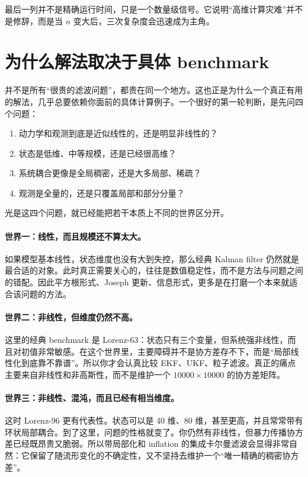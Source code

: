 \documentclass[12pt,a4paper]{ctexart}
\begin{document}
最后一列并不是精确运行时间，只是一个数量级信号。它说明“高维计算灾难”并不是修辞，而是当 \(n\) 变大后，三次复杂度会迅速成为主角。

\section{为什么解法取决于具体 benchmark}

并不是所有“很贵的滤波问题”，都贵在同一个地方。这也正是为什么一个真正有用的解法，几乎总要依赖你面前的具体计算例子。一个很好的第一轮判断，是先问四个问题：
\begin{enumerate}
  \item 动力学和观测到底是近似线性的，还是明显非线性的？
  \item 状态是低维、中等规模，还是已经很高维？
  \item 系统耦合更像是全局稠密，还是大多局部、稀疏？
  \item 观测是全量的，还是只覆盖局部和部分分量？
\end{enumerate}

光是这四个问题，就已经能把若干本质上不同的世界区分开。

\paragraph{世界一：线性，而且规模还不算太大。}
如果模型基本线性，状态维度也没有大到失控，那么经典 Kalman filter 仍然就是最合适的对象。此时真正需要关心的，往往是数值稳定性，而不是方法与问题之间的错配。因此平方根形式、Joseph 更新、信息形式，更多是在打磨一个本来就适合该问题的方法。

\paragraph{世界二：非线性，但维度仍然不高。}
这里的经典 benchmark 是 Lorenz-63：状态只有三个变量，但系统强非线性，而且对初值非常敏感。在这个世界里，主要障碍并不是协方差存不下，而是“局部线性化到底靠不靠谱”。所以你才会认真比较 EKF、UKF、粒子滤波。真正的痛点主要来自非线性和非高斯性，而不是维护一个 \(10000 \times 10000\) 的协方差矩阵。

\paragraph{世界三：非线性、混沌，而且已经有相当维度。}
这时 Lorenz-96 更有代表性。状态可以是 40 维、80 维，甚至更高，并且常常带有环状局部耦合。到了这里，问题的性格就变了。你仍然有非线性，但暴力传播协方差已经既昂贵又脆弱。所以带局部化和 inflation 的集成卡尔曼滤波会显得非常自然：它保留了随流形变化的不确定性，又不坚持去维护一个“唯一精确的稠密协方差”。
\end{document}
